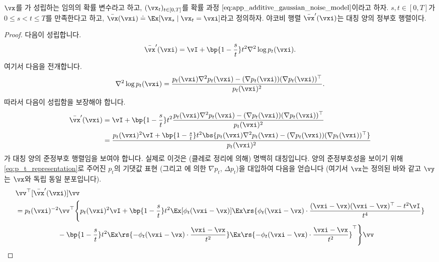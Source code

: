 \documentclass[../../book-main_ko.tex]{subfiles}
\begin{document}
\begin{lemma}\label{lem:gribonval_A1}
    \(\vx\)를 가 성립하는 임의의 확률 변수라고 하고, \((\vx_{t})_{t \in [0, T]}\)를 확률 과정 \(\eqref{eq:app_additive_gaussian_noise_model}\)이라고 하자. \(s, t \in [0, T]\)가 \(0 \leq s < t \leq T\)를 만족한다고 하고, \(\bar{\vx}(\vxi) \doteq \Ex[\vx_{s} \mid \vx_{t} = \vxi]\)라고 정의하자. 야코비 행렬 \(\bar{\vx}^{\prime}(\vxi)\)는 대칭 양의 정부호 행렬이다.
\end{lemma}
\begin{proof}
    다음이 성립합니다.
    \begin{equation}
        \bar{\vx}^{\prime}(\vxi) = \vI + \bp{1 - \frac{s}{t}}t^{2}\nabla^{2}\log p_{t}(\vxi).
    \end{equation}
    여기서 다음을 전개합니다.
    \begin{equation}
        \nabla^{2}\log p_{t}(\vxi) = \frac{p_{t}(\vxi)\nabla^{2}p_{t}(\vxi) - (\nabla p_{t}(\vxi))(\nabla p_{t}(\vxi))^{\top}}{p_{t}(\vxi)^{2}}.
    \end{equation}
    따라서 다음이 성립함을 보장해야 합니다.
    \begin{align}
        \bar{\vx}^{\prime}(\vxi)
        &= \vI + \bp{1 - \frac{s}{t}}t^{2}\frac{p_{t}(\vxi)\nabla^{2}p_{t}(\vxi) - (\nabla p_{t}(\vxi))(\nabla p_{t}(\vxi))^{\top}}{p_{t}(\vxi)^{2}} \\
        &= \frac{p_{t}(\vxi)^{2}\vI + \bp{1 - \frac{s}{t}}t^{2}\bs{p_{t}(\vxi)\nabla^{2}p_{t}(\vxi) - (\nabla p_{t}(\vxi))(\nabla p_{t}(\vxi))^{\top}}}{p_{t}(\vxi)^{2}}
    \end{align}
    가 대칭 양의 준정부호 행렬임을 보여야 합니다. 실제로 이것은 (클레로 정리에 의해) 명백히 대칭입니다. 양의 준정부호성을 보이기 위해 \eqref{eq:p_t_representation}로 주어진 \(p_{t}\)의 기댓값 표현 (그리고 에 의한 \(\nabla p_{t}\), \(\Delta p_{t}\))을 대입하여 다음을 얻습니다 (여기서 \(\vx\)는 정의된 바와 같고 \(\vy\)는 \(\vx\)와 독립 동일 분포입니다).
    \begin{align}
        &\vv^{\top}[\bar{\vx}^{\prime}(\vxi)]\vv \\
        &= p_{t}(\vxi)^{-2}\vv^{\top}\Bigg\{p_{t}(\vxi)^{2}\vI + \bp{1 - \frac{s}{t}}t^{2}\Ex[\phi_{t}(\vxi - \vx)]\Ex\rs{\phi_{t}(\vxi - \vx)\cdot\frac{(\vxi - \vx)(\vxi - \vx)^{\top} - t^{2}\vI}{t^{4}}} \\
        & \qquad \qquad \qquad -\bp{1 - \frac{s}{t}}t^{2}\Ex\rs{-\phi_{t}(\vxi - \vx)\cdot\frac{\vxi - \vx}{t^{2}}}\Ex\rs{-\phi_{t}(\vxi - \vx)\cdot\frac{\vxi - \vx}{t^{2}}}^{\top}\Bigg\}\vv \\

\end{align}
\end{proof}
\end{document}
